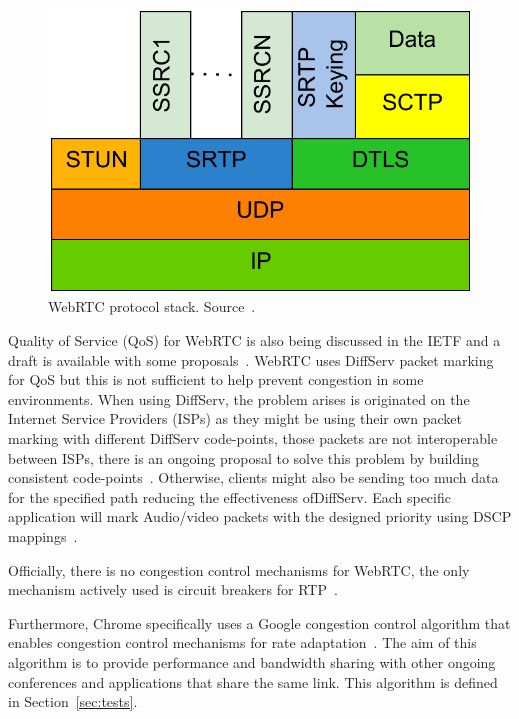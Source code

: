  \begin{figure}[h]
  \centering
    \includegraphics[scale=0.8]{./figures/protocolstack.pdf}
      \caption[WebRTC protocol stack. Source~\cite{salvatore}]{WebRTC protocol stack. Source~\cite{salvatore}.}
	\label{fig:stack}
\end{figure}

Quality of Service (QoS)  for WebRTC is also being discussed in the IETF and a draft is available with some proposals~\cite{qosWebRTCIETF}. WebRTC uses DiffServ packet marking for QoS but this is not sufficient to help prevent congestion in some environments. When using DiffServ, the problem arises is originated on the Internet Service Providers (ISPs) as they might be using their own packet marking with different DiffServ code-points, those packets are not interoperable between ISPs, there is an ongoing proposal to solve this problem by building consistent code-points~\cite{diffservIETF}. Otherwise, clients might also be sending too much data for the specified path reducing the effectiveness ofDiffServ. Each specific application will mark Audio/video packets with the designed priority using DSCP mappings~\cite{qosWebRTCIETF}. 

Officially, there is no congestion control mechanisms for WebRTC, the only mechanism actively used is circuit breakers for RTP~\cite{circuitbreakers}.

Furthermore, Chrome specifically uses a Google congestion control algorithm that enables congestion control mechanisms for rate adaptation~\cite{alvestrandCongestion2012}. The aim of this algorithm is to provide performance and bandwidth sharing with other ongoing conferences and applications that share the same link. This algorithm is defined in Section~\ref{sec:tests}.

